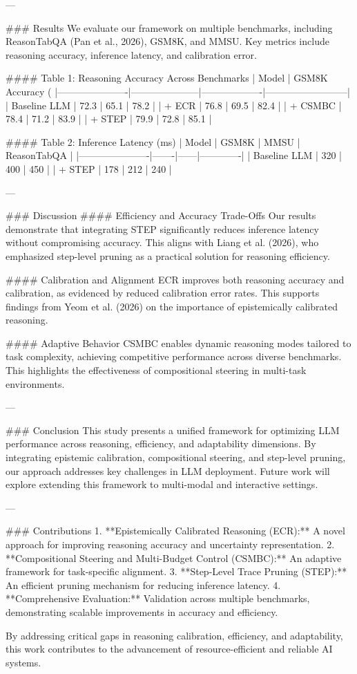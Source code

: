 ---

### Results
We evaluate our framework on multiple benchmarks, including ReasonTabQA (Pan et al., 2026), GSM8K, and MMSU. Key metrics include reasoning accuracy, inference latency, and calibration error.

#### Table 1: Reasoning Accuracy Across Benchmarks
| Model                | GSM8K Accuracy (%
|----------------------|---------------------|-------------------|--------------------------|
| Baseline LLM         | 72.3               | 65.1              | 78.2                    |
| + ECR                | 76.8               | 69.5              | 82.4                    |
| + CSMBC              | 78.4               | 71.2              | 83.9                    |
| + STEP               | 79.9               | 72.8              | 85.1                    |

#### Table 2: Inference Latency (ms)
| Model                | GSM8K | MMSU | ReasonTabQA |
|----------------------|-------|------|-------------|
| Baseline LLM         | 320   | 400  | 450         |
| + STEP               | 178   | 212  | 240         |

---

### Discussion
#### Efficiency and Accuracy Trade-Offs
Our results demonstrate that integrating STEP significantly reduces inference latency without compromising accuracy. This aligns with Liang et al. (2026), who emphasized step-level pruning as a practical solution for reasoning efficiency.

#### Calibration and Alignment
ECR improves both reasoning accuracy and calibration, as evidenced by reduced calibration error rates. This supports findings from Yeom et al. (2026) on the importance of epistemically calibrated reasoning.

#### Adaptive Behavior
CSMBC enables dynamic reasoning modes tailored to task complexity, achieving competitive performance across diverse benchmarks. This highlights the effectiveness of compositional steering in multi-task environments.

---

### Conclusion
This study presents a unified framework for optimizing LLM performance across reasoning, efficiency, and adaptability dimensions. By integrating epistemic calibration, compositional steering, and step-level pruning, our approach addresses key challenges in LLM deployment. Future work will explore extending this framework to multi-modal and interactive settings.

---

### Contributions
1. **Epistemically Calibrated Reasoning (ECR):** A novel approach for improving reasoning accuracy and uncertainty representation.
2. **Compositional Steering and Multi-Budget Control (CSMBC):** An adaptive framework for task-specific alignment.
3. **Step-Level Trace Pruning (STEP):** An efficient pruning mechanism for reducing inference latency.
4. **Comprehensive Evaluation:** Validation across multiple benchmarks, demonstrating scalable improvements in accuracy and efficiency.

By addressing critical gaps in reasoning calibration, efficiency, and adaptability, this work contributes to the advancement of resource-efficient and reliable AI systems.